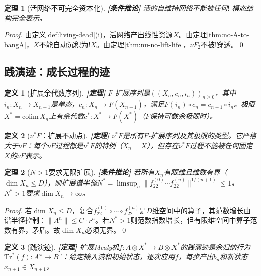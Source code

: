 \documentclass[11pt,a4paper]{article}
\newtheorem{definition}{定义}
\newtheorem{theorem}{定理}
\newcommand{\lvl}[1]{\hfill\textbf{\footnotesize[#1]}}
\newcommand{\lvP}{\lvl{定理}}
\newcommand{\lvC}{\lvl{条件推论}}
\newcommand{\bang}{{!}}
\newcommand{\tensor}{\otimes}
\begin{document}
\begin{theorem}[活网络不可完全资本化]\label{thm:living-not-capitalized}\lvC
活的自维持网络不能被任何$\bang$-模态结构完全表示。
\end{theorem}

\begin{proof}
由定义\ref{def:living-dead}(i)，活网络产出线性资源$X$。由定理\ref{thm:no-A-to-bangA}，$X$不能自动沉积为$\bang X$。由定理\ref{thm:nu-no-lift-life}，$\nu F_2$不被$\bang$穿透。\qed
\end{proof}

\subsection{践演迹：成长过程的迹}

\begin{definition}[扩展余代数序列]\label{def:expanding-coalgebra}\lvP
$F$-扩展序列是$((X_n,c_n,i_n))_{n\geq0}$，其中$i_n:X_n\to X_{n+1}$是单态，$c_n:X_n\to F(X_{n+1})$，满足$F(i_n)\circ c_n=c_{n+1}\circ i_n$。极限$X^*=\mathrm{colim}\,X_n$上有余代数$c^*:X^*\to F(X^*)$（$F$保持可数余极限时）。
\end{definition}

\begin{definition}[$\nu^*F$：扩展不动点]\label{def:nu-star}\lvP
$\nu^*F$是所有$F$-扩展序列及其极限的类型。它严格大于$\nu F$：每个$\nu F$过程都是$\nu^*F$的特例（$X_n=X$），但存在$\nu^*F$过程不能被任何固定$X$的$\nu F$表示。
\end{definition}

\begin{theorem}[$N>1$要求无限扩展]\label{thm:n1-requires-expansion}\lvC
若所有$X_n$有限维且维数有界（$\dim X_n\leq D$），则扩展谱半径$N^*=\limsup_n\|f_{22}^{(0)}\cdots f_{22}^{(n)}\|^{1/(n+1)}\leq1$。$N^*>1$要求$\dim X_n\to\infty$。
\end{theorem}

\begin{proof}
若$\dim X_n\leq D$，复合$f_{22}^{(0)}\circ\cdots\circ f_{22}^{(n)}$是$D$维空间中的算子，其范数增长由谱半径控制：$\|A^n\|\leq C\cdot r^n$。若$N^*>1$则范数指数增长，但有限维空间中算子范数有界，矛盾。故$\dim X_n$必须无界。\qed
\end{proof}

\begin{definition}[践演迹]\label{def:performative-trace}\lvP
扩展Mealy机$f:A\tensor X^*\to B\tensor X^*$的践演迹是余归纳行为$\mathrm{Tr}^*(f):A^\omega\to B^\omega$：给定输入流和初始状态，逐次应用$f$，每步产出$b_n$和新状态$x_{n+1}\in X_{n+1}$。
\end{definition}
\end{document}
